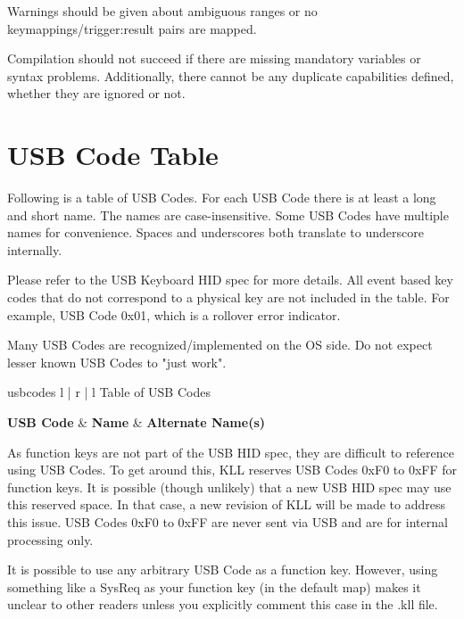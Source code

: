 \documentclass{kiibohd-template}
\begin{document}
Warnings should be given about ambiguous ranges or no keymappings/trigger:result pairs are mapped.

Compilation should not succeed if there are missing mandatory variables or syntax problems.
Additionally, there cannot be any duplicate capabilities defined, whether they are ignored or not.


\newpage
\chapter{USB Code Table}
\label{chpt:USBCodeTable}

Following is a table of USB Codes.
For each USB Code there is at least a long and short name.
The names are case-insensitive.
Some USB Codes have multiple names for convenience.
Spaces and underscores both translate to underscore internally.

Please refer to the USB Keyboard HID spec for more details.
All event based key codes that do not correspond to a physical key are not included in the table.
For example, USB Code 0x01, which is a rollover error indicator.

Many USB Codes are recognized/implemented on the OS side.
Do not expect lesser known USB Codes to "just work".

\begin{ltable}{usbcodes}{ l | r | l }{Table of USB Codes}

\textbf{USB Code} & \textbf{Name} & \textbf{Alternate Name(s)} \\
\hline
\hline


\end{ltable}

As function keys are not part of the USB HID spec, they are difficult to reference using USB Codes.
To get around this, KLL reserves USB Codes 0xF0 to 0xFF for function keys.
It is possible (though unlikely) that a new USB HID spec may use this reserved space.
In that case, a new revision of KLL will be made to address this issue.
USB Codes 0xF0 to 0xFF are never sent via USB and are for internal processing only.

It is possible to use any arbitrary USB Code as a function key.
However, using something like a SysReq as your function key (in the default map) makes it unclear to other readers unless you explicitly comment this case in the .kll file.


\newpage
\end{document}
